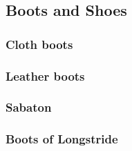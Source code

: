 \subsection{Boots and Shoes}

\subsubsection{Cloth boots}

\subsubsection{Leather boots}

\subsubsection{Sabaton}

\subsubsection{Boots of Longstride}